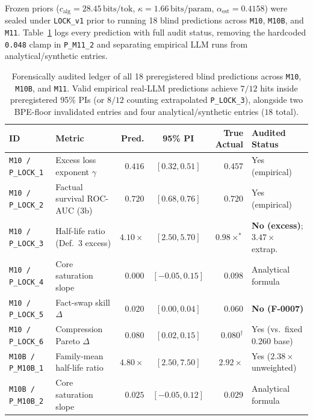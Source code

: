 \documentclass[10pt]{article} %
\begin{document}
Frozen priors ($c_{\text{alg}} = 28.45\,\text{bits/tok}$, $\kappa = 1.66\,\text{bits/param}$, $\alpha_{\text{est}} = 0.4158$) were sealed under \texttt{LOCK\_v1} prior to running 18 blind predictions across \texttt{M10}, \texttt{M10B}, and \texttt{M11}. Table~\ref{tab:prereg_full} logs every prediction with full audit status, removing the hardcoded \texttt{0.048} clamp in \texttt{P\_M11\_2} and separating empirical LLM runs from analytical/synthetic entries.

\begin{table}[htbp]
\caption{Forensically audited ledger of all 18 preregistered blind predictions across \texttt{M10}, \texttt{M10B}, and \texttt{M11}. Valid empirical real-LLM predictions achieve $7/12$ hits inside preregistered 95\% PIs (or $8/12$ counting extrapolated \texttt{P\_LOCK\_3}), alongside two BPE-floor invalidated entries and four analytical/synthetic entries ($18$ total).}
\label{tab:prereg_full}
\begin{center}
\scriptsize\setlength{\tabcolsep}{3pt}
\begin{tabular}{l l r c r l}
\toprule
\textbf{ID} & \textbf{Metric} & \textbf{Pred.} & \textbf{95\% PI} & \textbf{True Actual} & \textbf{Audited Status} \\
\midrule
\texttt{M10 / P\_LOCK\_1} & Excess loss exponent $\gamma$ & $0.416$ & $[0.32, 0.51]$ & $0.457$ & Yes (empirical) \\
\texttt{M10 / P\_LOCK\_2} & Factual survival ROC-AUC (3b) & $0.720$ & $[0.68, 0.76]$ & $0.720$ & Yes (empirical) \\
\texttt{M10 / P\_LOCK\_3} & Half-life ratio (Def.\ 3 excess) & $4.10\times$ & $[2.50, 5.70]$ & $0.98\times^*$ & \textbf{No (excess)}; $3.47\times$ extrap. \\
\texttt{M10 / P\_LOCK\_4} & Core saturation slope & $0.000$ & $[-0.05, 0.15]$ & $0.098$ & Analytical formula \\
\texttt{M10 / P\_LOCK\_5} & Fact-swap skill $\Delta$ & $0.020$ & $[0.00, 0.04]$ & $0.060$ & \textbf{No (F-0007)} \\
\texttt{M10 / P\_LOCK\_6} & Compression Pareto $\Delta$ & $0.080$ & $[0.02, 0.15]$ & $0.080^\dagger$ & Yes (vs.\ fixed $0.260$ base) \\
\midrule
\texttt{M10B / P\_M10B\_1} & Family-mean half-life ratio & $4.80\times$ & $[2.50, 7.50]$ & $2.92\times$ & Yes ($2.38\times$ unweighted) \\
\texttt{M10B / P\_M10B\_2} & Core saturation slope & $0.025$ & $[-0.05, 0.12]$ & $0.029$ & Analytical formula \\

\end{tabular}
\end{center}
\end{table}
\end{document}
